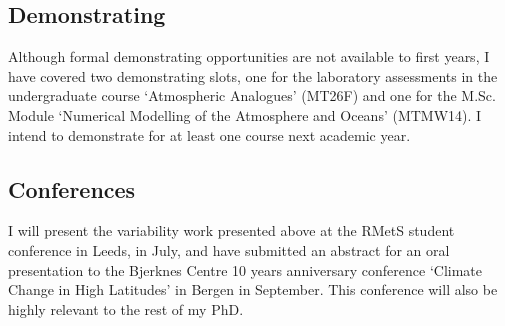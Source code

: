 \documentclass [11pt,a4paper,twosided] {report}
\begin{document}
\subsection*{Demonstrating}
Although formal demonstrating opportunities are not available to first years, I have covered two demonstrating slots, one for the laboratory assessments in the undergraduate course `Atmospheric Analogues' (MT26F) and one for the M.Sc. Module `Numerical Modelling of the Atmosphere and Oceans' (MTMW14). I intend to demonstrate for at least one course next academic year.

\subsection*{Conferences}
I will present the variability work presented above at the RMetS student conference in Leeds, in July, and have submitted an abstract for an oral presentation to the Bjerknes Centre 10 years anniversary conference `Climate Change in High Latitudes' in Bergen in September. This conference will also be highly relevant to the rest of my PhD.

\clearpage


\end{document}
